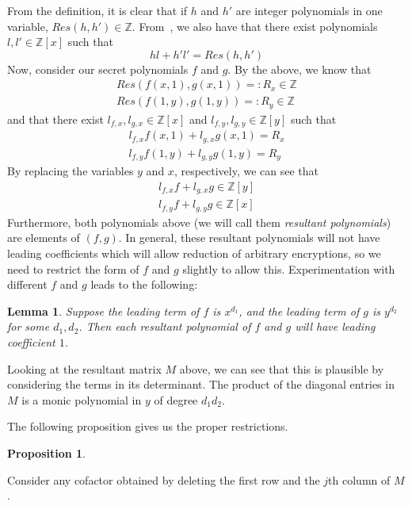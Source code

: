 \documentclass[11pt]{report}
\newtheorem{lemma}{Lemma}
\newtheorem{proposition}{Proposition}
\newcommand{\Z}{\mathbb{Z}}
\newcommand{\Zx}{\mathbb{Z}[x]}
\newcommand{\Zy}{\mathbb{Z}[y]}
\begin{document}
From the definition, it is clear that if $h$ and $h'$ are integer polynomials in one variable, $Res(h,h') \in \Z$. From~\cite{lang-algebra}, we also have that there exist polynomials $l,l'\in \Zx$ such that
\[hl+h'l' = Res(h,h') \]
Now, consider our secret polynomials $f$ and $g$. By the above, we know that
\begin{align*}
Res(f(x,1),g(x,1)) =: R_x \in \Z\\
Res(f(1,y),g(1,y)) =: R_y \in \Z
\end{align*}
and that there exist $l_{f,x}, l_{g,x}\in \Zx$ and $l_{f,y}, l_{g,y}\in \Zy$ such that
\begin{align*}
l_{f,x}f(x,1)+l_{g,x}g(x,1) = R_x\\
l_{f,y}f(1,y)+l_{g,y}g(1,y) = R_y
\end{align*}
By replacing the variables $y$ and $x$, respectively, we can see that
\begin{align*}
l_{f,x}f+l_{g,x}g \in \Zy\\
l_{f,y}f+l_{g,y}g \in \Zx
\end{align*}
Furthermore, both polynomials above (we will call them \emph{resultant polynomials}) are elements of $(f,g)$. In general, these resultant polynomials will not have leading coefficients which will allow reduction of arbitrary encryptions, so we need to restrict the form of $f$ and $g$ slightly to allow this. Experimentation with different $f$ and $g$ leads to the following:

\begin{lemma}
Suppose the leading term of $f$ is $x^{d_1}$, and the leading term of $g$ is $y^{d_2}$ for some $d_1, d_2$. Then each resultant polynomial of $f$ and $g$ will have leading coefficient $1$.
\end{lemma}

Looking at the resultant matrix $M$ above, we can see that this is plausible by considering the terms in its determinant. The product of the diagonal entries in $M$ is a monic polynomial in $y$ of degree $d_1d_2$.

The following proposition gives us the proper restrictions.

\begin{proposition}

\end{proposition}


Consider any cofactor obtained by deleting the first row and the $j$th column of $M$. 
\end{document}
